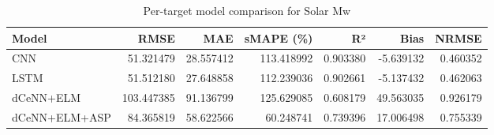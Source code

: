 \begin{table}
\caption{Per-target model comparison for Solar Mw}
\begin{tabular}{lrrrrrr}
\toprule
Model & RMSE & MAE & sMAPE (\%) & R² & Bias & NRMSE \\
\midrule
CNN & 51.321479 & 28.557412 & 113.418992 & 0.903380 & -5.639132 & 0.460352 \\
LSTM & 51.512180 & 27.648858 & 112.239036 & 0.902661 & -5.137432 & 0.462063 \\
dCeNN+ELM & 103.447385 & 91.136799 & 125.629085 & 0.608179 & 49.563035 & 0.926179 \\
dCeNN+ELM+ASP & 84.365819 & 58.622566 & 60.248741 & 0.739396 & 17.006498 & 0.755339 \\
\bottomrule
\end{tabular}
\end{table}

